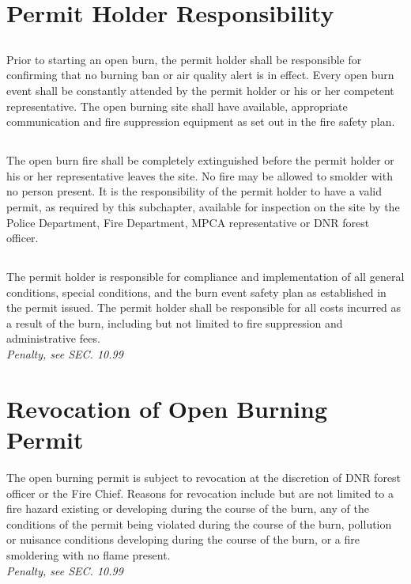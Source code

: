 \section{Permit Holder Responsibility}
\subsection{}
Prior to starting an open burn, the permit holder shall be responsible for confirming that no burning ban or air quality alert is in effect.  Every open burn event shall be constantly attended by the permit holder or his or her competent representative.  The open burning site shall have available, appropriate communication and fire suppression equipment as set out in the fire safety plan.
\subsection{}
The open burn fire shall be completely extinguished before the permit holder or his or her representative leaves the site.  No fire may be allowed to smolder with no person present.  It is the responsibility of the permit holder to have a valid permit, as required by this subchapter, available for inspection on the site by the Police Department, Fire Department, MPCA representative or DNR forest officer.
\subsection{}
The permit holder is responsible for compliance and implementation of all general conditions, special conditions, and the burn event safety plan as established in the permit issued.  The permit holder shall be responsible for all costs incurred as a result of the burn, including but not limited to fire suppression and administrative fees.\\
\emph{Penalty, see SEC. 10.99}
\section{Revocation of Open Burning Permit}
The open burning permit is subject to revocation at the discretion of DNR forest officer or the Fire Chief.  Reasons for revocation include but are not limited to a fire hazard existing or developing during the course of the burn, any of the conditions of the permit being violated during the course of the burn, pollution or nuisance conditions developing during the course of the burn, or a fire smoldering with no flame present.\\
\emph{Penalty, see SEC. 10.99}
